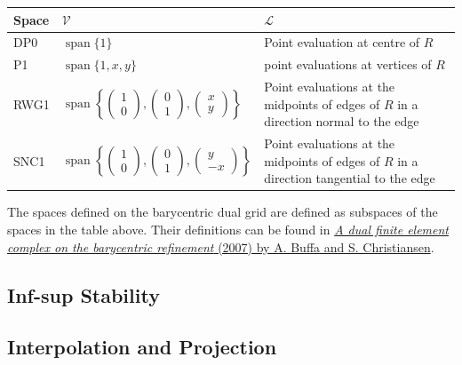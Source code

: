 \documentclass[a4paper]{book}
\begin{document}
\begin{center}
\begin{tabular}{|l|l|l|}
\hline
Space & $\mathcal{V}$ & $\mathcal{L}$\\
\hline
DP0   & $\operatorname{span}\{1\}$ & Point evaluation at centre of $R$\\
P1    & $\operatorname{span}\{1, x, y\}$ & point evaluations at vertices of $R$\\
RWG1  & $\operatorname{span}\left\{\left(\begin{array}{c}1\\0\end{array}\right),\left(\begin{array}{c}0\\1\end{array}\right),\left(\begin{array}{c}x\\y\end{array}\right)\right\}$ & Point evaluations at the midpoints of edges of $R$ in a direction normal to the edge\\
SNC1  & $\operatorname{span}\left\{\left(\begin{array}{c}1\\0\end{array}\right),\left(\begin{array}{c}0\\1\end{array}\right),\left(\begin{array}{c}y\\-x\end{array}\right)\right\}$ & Point evaluations at the midpoints of edges of $R$ in a direction tangential to the edge\\
\hline
\end{tabular}
\end{center}
The spaces defined on the barycentric dual grid are defined as subspaces of the spaces
in the table above. Their definitions can be found in
\href{https://www.jstor.org/stable/40234460?seq=1}{\emph{A dual finite element complex on the barycentric refinement} (2007) by A. Buffa and S. Christiansen}.


\subsection{Inf-sup Stability}



\subsection{Interpolation and Projection}
\end{document}
